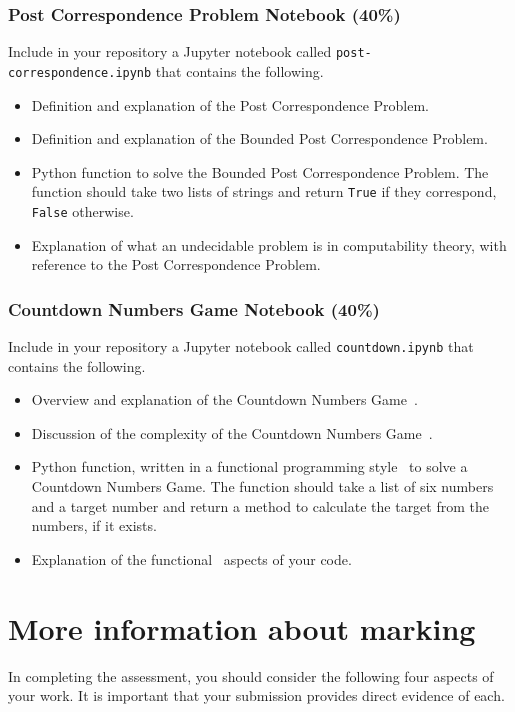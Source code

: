 \documentclass[a4paper, 12pt]{scrartcl}
\begin{document}
  \subsubsection*{Post Correspondence Problem Notebook (40\%)}
  Include in your repository a Jupyter notebook called \texttt{post-correspondence.ipynb} that contains the following.
  \begin{itemize}
    \item Definition and explanation of the Post Correspondence Problem.
    \item Definition and explanation of the Bounded Post Correspondence Problem.
    \item Python function to solve the Bounded Post Correspondence Problem. The function should take two lists of strings and return \texttt{True} if they correspond, \texttt{False} otherwise.
    \item Explanation of what an undecidable problem is in computability theory, with reference to the Post Correspondence Problem.
  \end{itemize}
  
  \subsubsection*{Countdown Numbers Game Notebook (40\%)}
  Include in your repository a Jupyter notebook called \texttt{countdown.ipynb} that contains the following.
  \begin{itemize}
    \item Overview and explanation of the Countdown Numbers Game~\cite{countdownnumbers}.
    \item Discussion of the complexity of the Countdown Numbers Game~\cite{countdownnumbers}.
    \item Python function, written in a functional programming style~\cite{pythonfunctional} to solve a Countdown Numbers Game. The function should take a list of six numbers and a target number and return a method to calculate the target from the numbers, if it exists.
    \item Explanation of the functional~\cite{pythonfunctional} aspects of your code.
  \end{itemize}

  \section*{More information about marking}
    In completing the assessment, you should consider the following four aspects of your work.
    It is important that your submission provides direct evidence of each.
    
\end{document}
